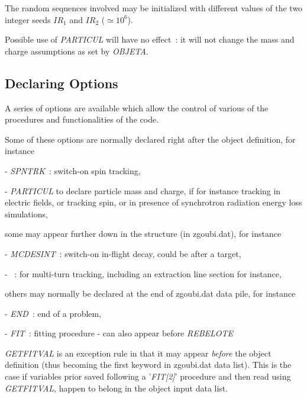 \noindent The random sequences involved may be initialized with different
values of the 
two integer seeds $ IR_1 $ and $ IR_2 $ ($\simeq 10^6 $). 

\bigskip

\noindent Possible use of \textsl{PARTICUL} will have no effect~: it will not change the mass
 and charge assumptions as set  by \textsl{OBJETA}.


\newpage

\subsection{Declaring  Options} \label{sec4.3}

A series of options are available which allow the control of various of the procedures and 
functionalities of the code. 

\medskip

\noindent Some of these options are normally declared right after 
the object definition, for instance 

- \textsl{SPNTRK}~:  switch-on spin tracking, 

- \textsl{PARTICUL} to declare particle mass and charge, if for instance tracking in electric fields, 
or tracking spin, or in presence of synchrotron radiation energy loss simulations, 

\medskip 

\noindent  some may appear further down in the structure (in zgoubi.dat), for instance 

- \textsl{MCDESINT}~: switch-on in-flight decay, could be after a target, 

- \REBELOTE{}~: for multi-turn tracking, including  an extraction line section for instance, 

\medskip

\noindent others may  normally be declared at the end of zgoubi.dat  data pile, for instance

- \textsl{END}~:  end of a problem, 

- \textsl{FIT}~: fitting procedure - can also appear before \textsl{REBELOTE}


\medskip

\noindent \textsl{GETFITVAL} is an exception  rule in that it may appear 
\textsl{before} the object definition (thus becoming the first keyword in zgoubi.dat data list). This is 
the case if  variables prior saved following a '\textsl{FIT[2]}' procedure 
and then read using \textsl{GETFITVAL}, happen to belong in the object input data list. 

